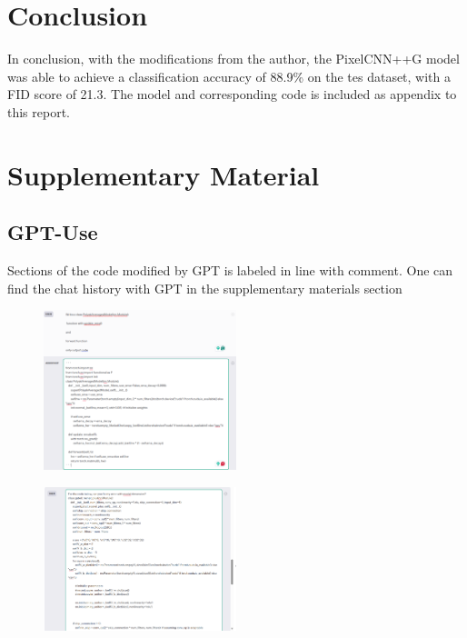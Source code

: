 \documentclass{article}
\begin{document}
\section{Conclusion}

In conclusion, with the modifications from the author, the PixelCNN++G model was able to achieve a classification accuracy of 88.9\% on the tes dataset, with a FID score of 21.3. The model and corresponding code is included as appendix to this report.


\section{Supplementary Material}

\subsection{GPT-Use}
Sections of the code modified by GPT is labeled in line with comment. One can find the chat history with GPT in the supplementary materials section

\begin{figure}[H]
    \centering
    \includegraphics[width=0.5\textwidth]{report_data/g-1.png}
\end{figure}

\begin{figure}[H]
    \centering
    \includegraphics[width=0.5\textwidth]{report_data/g-2.png}
\end{figure}
\end{document}
